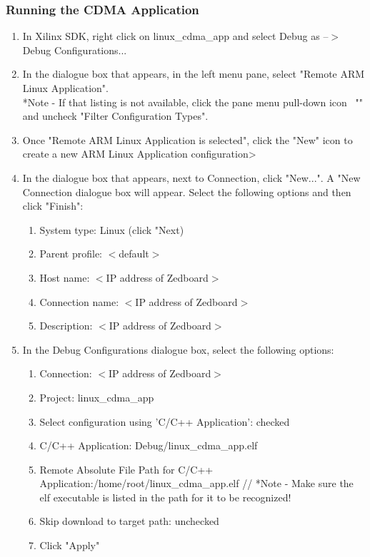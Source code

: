 \documentclass[12pt]{article}
\begin{document}
\subsubsection{Running the CDMA Application}
\begin{enumerate}
\item In Xilinx SDK, right click on linux\_cdma\_app and select Debug as --$>$ Debug Configurations...

\item In the dialogue box that appears, in the left menu pane, select "Remote ARM Linux Application".  \\
*Note - If that listing is not available, click the pane menu pull-down icon \, "\raisebox{-5pt}{\bf\large{\v{}}}" and uncheck "Filter Configuration Types".
\item Once "Remote ARM Linux Application is selected", click the "New" icon to create a new ARM Linux Application configuration>
\item In the dialogue box that appears, next to Connection, click "New...".  A "New Connection dialogue box will appear.  Select the following options and then click "Finish":
\begin{enumerate}
\item System type: Linux (click "Next)
\item Parent profile: $<$default$>$
\item Host name: $<$IP address of Zedboard$>$
\item Connection name: $<$IP address of Zedboard$>$
\item Description: $<$IP address of Zedboard$>$
\end{enumerate}
\item In the Debug Configurations dialogue box, select the following options:
\begin{enumerate}
\item Connection: $<$IP address of Zedboard$>$
\item Project: linux\_cdma\_app
\item Select configuration using 'C/C++ Application': checked
\item C/C++ Application: Debug/linux\_cdma\_app.elf
\item Remote Absolute File Path for C/C++ Application:/home/root/linux\_cdma\_app.elf //
*Note - Make sure the elf executable is listed in the path for it to be recognized!
\item Skip download to target path: unchecked
\item Click "Apply"
\end{enumerate}


\end{enumerate}
\end{document}
